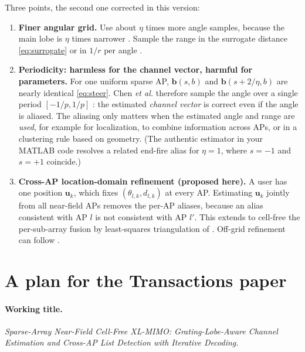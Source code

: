 \documentclass[11pt]{article}
\newcommand{\bb}{\mathbf{b}}
\begin{document}
Three points, the second one corrected in this version:
\begin{enumerate}
  \item \textbf{Finer angular grid.} Use about $\eta$ times more angle samples, because the main lobe is $\eta$ times narrower \cite[Proposition~1]{zhou2025sparse}. Sample the range in the surrogate distance \eqref{eq:surrogate} \cite{chen2024nearfield} or in $1/r$ per angle \cite{cui2022channel}.
  \item \textbf{Periodicity: harmless for the channel vector, harmful for parameters.} For one uniform sparse AP, $\bb(s,b)$ and $\bb(s+2/\eta,b)$ are nearly identical \eqref{eq:steer}. Chen \emph{et al.} therefore sample the angle over a single period $[-1/p,1/p]$ \cite[eq.~(47)]{chen2024nearfield}: the estimated \emph{channel vector} is correct even if the angle is aliased. The aliasing only matters when the estimated angle and range are \emph{used}, for example for localization, to combine information across APs, or in a clustering rule based on geometry. (The authentic estimator in your MATLAB code resolves a related end-fire alias for $\eta=1$, where $s=-1$ and $s=+1$ coincide.)
  \item \textbf{Cross-AP location-domain refinement (proposed here).} A user has one position $\mathbf u_k$, which fixes $(\theta_{l,k},d_{l,k})$ at every AP. Estimating $\mathbf u_k$ jointly from all near-field APs removes the per-AP aliases, because an alias consistent with AP $l$ is not consistent with AP $l'$. This extends to cell-free the per-sub-array fusion by least-squares triangulation of \cite{kosasih2025mla}. Off-grid refinement can follow \cite{chen2024nearfield,cui2022channel}.
\end{enumerate}

\section{A plan for the Transactions paper}
\label{sec:plan}

\paragraph{Working title.} \emph{Sparse-Array Near-Field Cell-Free XL-MIMO: Grating-Lobe-Aware Channel Estimation and Cross-AP List Detection with Iterative Decoding.}
\end{document}
